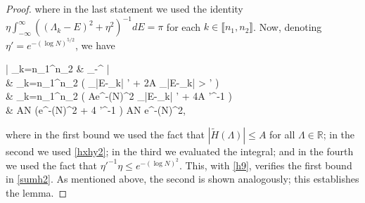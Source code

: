 \documentclass{amsart}
\numberwithin{equation}{section}
\theoremstyle{remark}
\theoremstyle{definition}
\begin{document}
\begin{proof}
		\noindent where in the last statement we used the identity $\eta \int_{-\infty}^{\infty} ( (\Lambda_k - E)^2 + \eta^2 )^{-1} dE = \pi$ for each $k \in \llbracket n_1, n_2 \rrbracket$.  Now, denoting $\eta' = e^{-(\log N)^{5/2}}$, we have
		\begin{flalign*} 
			\Bigg| \displaystyle\sum_{k=n_1}^{n_2} & \displaystyle\frac{\eta}{\pi} \displaystyle\int_{-\infty}^{\infty} \displaystyle{} \Bigg| \\
			&  \le \displaystyle\sum_{k=n_1}^{n_2} \displaystyle\frac{\eta}{\pi} \Bigg( \displaystyle\int_{|E-\Lambda_k| \le \eta'} \displaystyle{} + 2A \displaystyle\int_{|E-\Lambda_k| > \eta'} \displaystyle{} \Bigg) \\
			& \le \displaystyle\sum_{k=n_1}^{n_2} \displaystyle\frac{\eta}{\pi} \Bigg( Ae^{-(\log N)^2} \displaystyle\int_{|E-\Lambda_k| \le \eta'} \displaystyle{} + 4A \eta'^{-1} \Bigg) \\
			& \le AN (e^{-(\log N)^2} + 4 \eta'^{-1} \eta )  AN e^{-(\log N)^2},
		\end{flalign*} 
		
		\noindent where in the first bound we used the fact that $| \tilde{H}(\Lambda) | \le A$ for all $\Lambda \in \mathbb{R}$; in the second we used \eqref{hxhy2}; in the third we evaluated the integral; and in the fourth we used the fact that $\eta'^{-1} \eta \le e^{-(\log N)^2}$. This, with \eqref{h9}, verifies the first bound in \eqref{sumh2}. As mentioned above, the second is shown analogously; this establishes the lemma.
	\end{proof}
	
	
	
\end{document}
